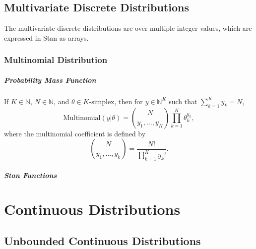 \begin{description}
\chapter{Multivariate Discrete Distributions}


The multivariate discrete distributions are over multiple integer values, which are expressed in Stan as arrays.


\section{Multinomial Distribution}


\subsubsection{Probability Mass Function}


If $K \in \mathbb{N}$, $N \in \mathbb{N}$, and $\theta \in \text{$K$-simplex}$, then for $y \in \mathbb{N}^K$ such that $\sum_{k=1}^K y_k = N$, \[ \text{Multinomial}(y|\theta) = \binom{N}{y_1,\ldots,y_K} \prod_{k=1}^K \theta_k^{y_k}, \] where the multinomial coefficient is defined by \[ \binom{N}{y_1,\ldots,y_k} = \frac{N!}{\prod_{k=1}^K y_k!}. \] 



\subsubsection{Stan Functions}


\begin{description}    \end{description}


\part{Continuous Distributions}\label{continuous-prob-functions.part}


\chapter{Unbounded Continuous Distributions}



\end{description}
